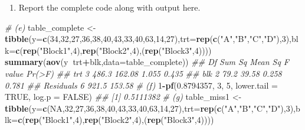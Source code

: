 \documentclass[]{article}
\newenvironment{Shaded}{\begin{snugshade}}{\end{snugshade}}
\newcommand{\CommentTok}[1]{\textcolor[rgb]{0.56,0.35,0.01}{\textit{#1}}}
\newcommand{\DataTypeTok}[1]{\textcolor[rgb]{0.13,0.29,0.53}{#1}}
\newcommand{\DecValTok}[1]{\textcolor[rgb]{0.00,0.00,0.81}{#1}}
\newcommand{\FloatTok}[1]{\textcolor[rgb]{0.00,0.00,0.81}{#1}}
\newcommand{\KeywordTok}[1]{\textcolor[rgb]{0.13,0.29,0.53}{\textbf{#1}}}
\newcommand{\NormalTok}[1]{#1}
\newcommand{\OperatorTok}[1]{\textcolor[rgb]{0.81,0.36,0.00}{\textbf{#1}}}
\newcommand{\OtherTok}[1]{\textcolor[rgb]{0.56,0.35,0.01}{#1}}
\newcommand{\StringTok}[1]{\textcolor[rgb]{0.31,0.60,0.02}{#1}}
\providecommand{\tightlist}{%
  \setlength{\itemsep}{0pt}\setlength{\parskip}{0pt}}
\begin{document}
\begin{enumerate}
\def\labelenumi{(\alph{enumi})}
\setcounter{enumi}{7}
\tightlist
\item
  Report the complete code along with output here.
\end{enumerate}

\begin{Shaded}
\begin{Highlighting}[]
\CommentTok{# (e)}
\NormalTok{table_complete <-}\StringTok{ }\KeywordTok{tibble}\NormalTok{(}\DataTypeTok{y=}\KeywordTok{c}\NormalTok{(}\DecValTok{34}\NormalTok{,}\DecValTok{32}\NormalTok{,}\DecValTok{27}\NormalTok{,}\DecValTok{36}\NormalTok{,}\DecValTok{38}\NormalTok{,}\DecValTok{40}\NormalTok{,}\DecValTok{43}\NormalTok{,}\DecValTok{33}\NormalTok{,}\DecValTok{40}\NormalTok{,}\DecValTok{63}\NormalTok{,}\DecValTok{14}\NormalTok{,}\DecValTok{27}\NormalTok{),}\DataTypeTok{trt=}\KeywordTok{rep}\NormalTok{(}\KeywordTok{c}\NormalTok{(}\StringTok{"A"}\NormalTok{,}\StringTok{"B"}\NormalTok{,}\StringTok{"C"}\NormalTok{,}\StringTok{"D"}\NormalTok{),}\DecValTok{3}\NormalTok{),}\DataTypeTok{blk=}\KeywordTok{c}\NormalTok{(}\KeywordTok{rep}\NormalTok{(}\StringTok{"Block1"}\NormalTok{,}\DecValTok{4}\NormalTok{),}\KeywordTok{rep}\NormalTok{(}\StringTok{"Block2"}\NormalTok{,}\DecValTok{4}\NormalTok{),(}\KeywordTok{rep}\NormalTok{(}\StringTok{"Block3"}\NormalTok{,}\DecValTok{4}\NormalTok{))))}
\KeywordTok{summary}\NormalTok{(}\KeywordTok{aov}\NormalTok{(y}\OperatorTok{~}\NormalTok{trt}\OperatorTok{+}\NormalTok{blk,}\DataTypeTok{data=}\NormalTok{table_complete))}
\CommentTok{##             Df Sum Sq Mean Sq F value Pr(>F)}
\CommentTok{## trt          3  486.3  162.08   1.055  0.435}
\CommentTok{## blk          2   79.2   39.58   0.258  0.781}
\CommentTok{## Residuals    6  921.5  153.58}
\CommentTok{# (f)}
\DecValTok{1}\OperatorTok{-}\KeywordTok{pf}\NormalTok{(}\FloatTok{0.8794357}\NormalTok{, }\DecValTok{3}\NormalTok{, }\DecValTok{5}\NormalTok{, }\DataTypeTok{lower.tail =} \OtherTok{TRUE}\NormalTok{, }\DataTypeTok{log.p =} \OtherTok{FALSE}\NormalTok{)}
\CommentTok{## [1] 0.5111382}
\CommentTok{# (g)}
\NormalTok{table_miss1 <-}\StringTok{ }\KeywordTok{tibble}\NormalTok{(}\DataTypeTok{y=}\KeywordTok{c}\NormalTok{(}\OtherTok{NA}\NormalTok{,}\DecValTok{32}\NormalTok{,}\DecValTok{27}\NormalTok{,}\DecValTok{36}\NormalTok{,}\DecValTok{38}\NormalTok{,}\DecValTok{40}\NormalTok{,}\DecValTok{43}\NormalTok{,}\DecValTok{33}\NormalTok{,}\DecValTok{40}\NormalTok{,}\DecValTok{63}\NormalTok{,}\DecValTok{14}\NormalTok{,}\DecValTok{27}\NormalTok{),}\DataTypeTok{trt=}\KeywordTok{rep}\NormalTok{(}\KeywordTok{c}\NormalTok{(}\StringTok{"A"}\NormalTok{,}\StringTok{"B"}\NormalTok{,}\StringTok{"C"}\NormalTok{,}\StringTok{"D"}\NormalTok{),}\DecValTok{3}\NormalTok{),}\DataTypeTok{blk=}\KeywordTok{c}\NormalTok{(}\KeywordTok{rep}\NormalTok{(}\StringTok{"Block1"}\NormalTok{,}\DecValTok{4}\NormalTok{),}\KeywordTok{rep}\NormalTok{(}\StringTok{"Block2"}\NormalTok{,}\DecValTok{4}\NormalTok{),(}\KeywordTok{rep}\NormalTok{(}\StringTok{"Block3"}\NormalTok{,}\DecValTok{4}\NormalTok{))))}

\end{Highlighting}
\end{Shaded}
\end{document}
